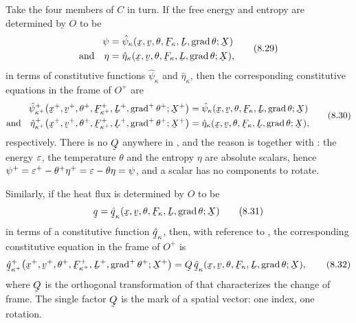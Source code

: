 Take the four members of $C$ in turn. If the free energy and entropy are
determined by $O$ to be
\begin{equation}
\begin{aligned}
   \psi&=\hat\psi_{\kappa}(\bx,\bv,\theta,\bF_{\kappa},\bL,
     \grad\theta;\bX)\\
   \text{and}\quad
   \eta&=\hat\eta_{\kappa}(\bx,\bv,\theta,\bF_{\kappa},\bL,
     \grad\theta;\bX),
\end{aligned}
   \tag{8.29}\label{eq:8.29}
\end{equation}
in terms of constitutive functions $\hat\psi_{\kappa}$ and
$\hat\eta_{\kappa}$, then the corresponding constitutive equations in
the frame of $O^{+}$ are
\begin{equation}
\begin{aligned}
   \hat\psi^{+}_{\kappa^{+}}\big(\bx^{+},\bv^{+},\theta^{+},
     \bF^{+}_{\kappa^{+}},\bL^{+},\grad^{+}\theta^{+};\bX^{+}\big)
   &=\hat\psi_{\kappa}(\bx,\bv,\theta,\bF_{\kappa},\bL,
     \grad\theta;\bX)\\
   \text{and}\quad
   \hat\eta^{+}_{\kappa^{+}}\big(\bx^{+},\bv^{+},\theta^{+},
     \bF^{+}_{\kappa^{+}},\bL^{+},\grad^{+}\theta^{+};\bX^{+}\big)
   &=\hat\eta_{\kappa}(\bx,\bv,\theta,\bF_{\kappa},\bL,
     \grad\theta;\bX),
\end{aligned}
   \tag{8.30}\label{eq:8.30}
\end{equation}
respectively. There is no $\bQ$ anywhere in , and the reason
is  together with : the energy $\varepsilon$, the
temperature $\theta$ and the entropy $\eta$ are absolute scalars, hence
$\psi^{+}=\varepsilon^{+}-\theta^{+}\eta^{+}=\varepsilon-\theta\eta=\psi$, and a
scalar has no components to rotate.

Similarly, if the heat flux is determined by $O$ to be
\begin{equation}
   \bq=\hat\bq_{\kappa}(\bx,\bv,\theta,\bF_{\kappa},\bL,\grad\theta;\bX)
   \tag{8.31}\label{eq:8.31}
\end{equation}
in terms of a constitutive function $\hat\bq_{\kappa}$, then, with
reference to , the corresponding constitutive equation in the
frame of $O^{+}$ is
\begin{equation}
   \hat\bq^{+}_{\kappa^{+}}\big(\bx^{+},\bv^{+},\theta^{+},
     \bF^{+}_{\kappa^{+}},\bL^{+},\grad^{+}\theta^{+};\bX^{+}\big)
   =\bQ\,\hat\bq_{\kappa}(\bx,\bv,\theta,\bF_{\kappa},\bL,
     \grad\theta;\bX),
   \tag{8.32}\label{eq:8.32}
\end{equation}
where $\bQ$ is the orthogonal transformation of  that
characterizes the change of frame. The single factor $\bQ$ is the mark
of a spatial vector: one index, one rotation.

